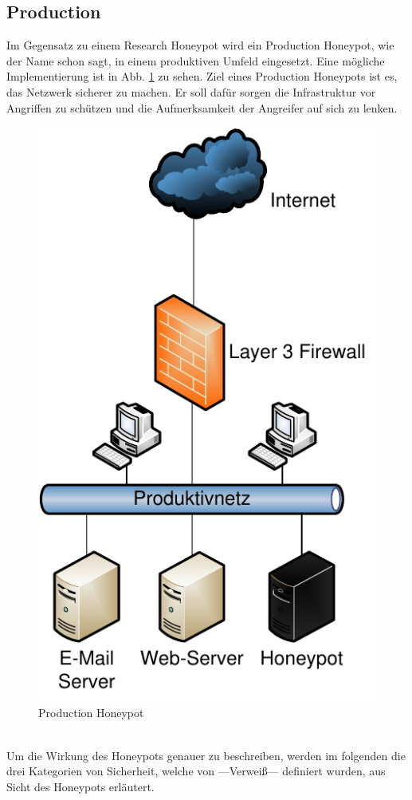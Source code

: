 \subsection{Production}

Im Gegensatz zu einem Research Honeypot wird ein Production Honeypot, wie der Name schon sagt, in einem produktiven Umfeld eingesetzt. Eine mögliche Implementierung ist in Abb. \ref{hnet:prodhon} zu sehen. Ziel eines Production Honeypots ist es, das Netzwerk sicherer zu machen. Er soll dafür sorgen die Infrastruktur vor Angriffen zu schützen und die Aufmerksamkeit der Angreifer auf sich zu lenken. 
\\
\begin{figure}[ht]
    \centering\includegraphics[scale=0.6]{Bilder/produktiv.pdf}
  \caption{Production Honeypot}
  \label{hnet:prodhon}
\end{figure}
\\
Um die Wirkung des Honeypots genauer zu beschreiben, werden im folgenden die drei Kategorien von \glqq Sicherheit\grqq, welche von ---Verweiß--- definiert wurden, aus Sicht des Honeypots erläutert. 

